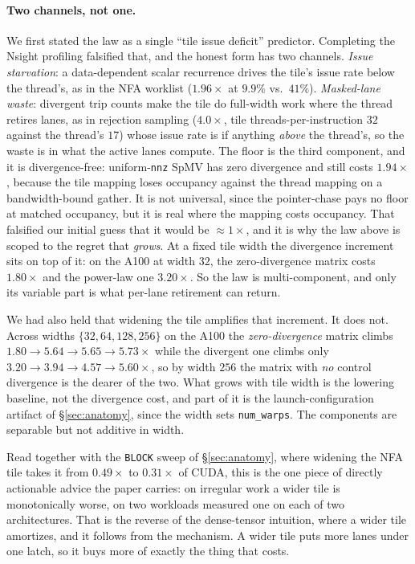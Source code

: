 \documentclass[sigplan,screen,review,anonymous]{acmart}
\begin{document}
\paragraph{Two channels, not one.} We first stated the law as a single ``tile issue
deficit'' predictor. Completing the Nsight profiling falsified that, and the honest form has
two channels. \emph{Issue starvation}: a data-dependent scalar recurrence drives the tile's
issue rate below the thread's, as in the NFA worklist ($1.96\times$ at $9.9\%$ vs.\ $41\%$).
\emph{Masked-lane waste}: divergent trip counts make the tile do full-width work where the
thread retires lanes, as in rejection sampling ($4.0\times$, tile threads-per-instruction
$32$ against the thread's $17$) whose issue rate is if anything \emph{above} the thread's,
so the waste is in what the active lanes compute. The floor is the third component, and it is
divergence-free: uniform-\texttt{nnz} SpMV has zero divergence and still costs
$1.94\times$, because the tile mapping loses occupancy against the thread mapping on a
bandwidth-bound gather. It is not universal, since the pointer-chase pays no floor at
matched occupancy, but it is real where the mapping costs occupancy. That falsified our
initial guess that it would be ${\approx}1\times$, and it is why the law above is scoped
to the regret that \emph{grows}. At a fixed tile width the divergence increment sits on top
of it: on the A100 at width $32$, the zero-divergence matrix costs $1.80\times$ and the
power-law one $3.20\times$. So the law is multi-component, and only its variable part is
what per-lane retirement can return.

We had also held that widening the tile amplifies that increment. It does not. Across
widths $\{32,64,128,256\}$ on the A100 the \emph{zero-divergence} matrix climbs
$1.80\rightarrow5.64\rightarrow5.65\rightarrow5.73\times$ while the divergent one climbs
only $3.20\rightarrow3.94\rightarrow4.57\rightarrow5.60\times$, so by width $256$ the
matrix with \emph{no} control divergence is the dearer of the two. What grows with tile
width is the lowering baseline, not the divergence cost, and part of it is the
launch-configuration artifact of \S\ref{sec:anatomy}, since the width sets
\texttt{num\_warps}. The components are separable but not additive in width.

Read together with the \texttt{BLOCK} sweep of \S\ref{sec:anatomy}, where widening the
NFA tile takes it from $0.49\times$ to $0.31\times$ of CUDA, this is the one piece of
directly actionable advice the paper carries: on irregular work a wider tile is
monotonically worse, on two workloads measured one on each of two architectures. That is the reverse of the
dense-tensor intuition, where a wider tile amortizes, and it follows from the mechanism.
A wider tile puts more lanes under one latch, so it buys more of exactly the thing that
costs.
\end{document}

